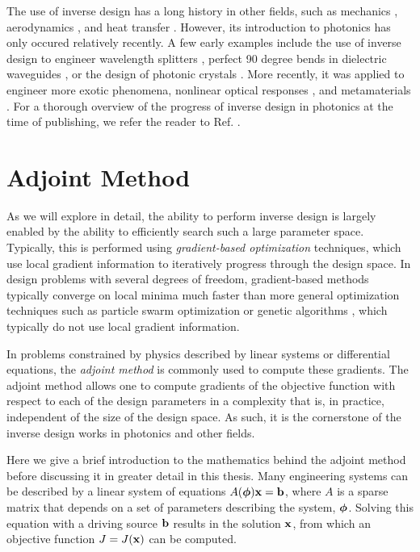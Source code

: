 The use of inverse design has a long history in other fields, such as mechanics \cite{tanaka_inverse_1998}, aerodynamics \cite{jameson_aerodynamic_nodate}, and heat transfer \cite{ozisik_inverse_2018}.
However, its introduction to photonics has only occured relatively recently.
A few early examples include the use of inverse design to engineer wavelength splitters \cite{piggott_inverse_2015}, perfect 90 degree bends in dielectric waveguides \cite{jensen_topology_2005}, or the design of photonic crystals \cite{borel_topology_2004}.
More recently, it was applied to engineer more exotic phenomena, nonlinear optical responses \cite{lin_cavity-enhanced_2016}, and metamaterials \cite{sigmund_systematic_2009}.
For a thorough overview of the progress of inverse design in photonics at the time of publishing, we refer the reader to Ref. .

\section{Adjoint Method}

As we will explore in detail, the ability to perform inverse design is largely enabled by the ability to efficiently search such a large parameter space.
Typically, this is performed using \textit{gradient-based optimization} techniques, which use local gradient information to iteratively progress through the design space.
In design problems with several degrees of freedom, gradient-based methods typically converge on local minima much faster than more general optimization techniques such as particle swarm optimization \cite{noauthor_particle_nodate} or genetic algorithms \cite{whitley_genetic_1994}, which typically do not use local gradient information.

In problems constrained by physics described by linear systems or differential equations, the \textit{adjoint method} is commonly used to compute these gradients.
The adjoint method allows one to compute gradients of the objective function with respect to each of the design parameters in a complexity that is, in practice, independent of the size of the design space.
As such, it is the cornerstone of the inverse design works in photonics and other fields.

Here we give a brief introduction to the mathematics behind the adjoint method before discussing it in greater detail in this thesis.
Many engineering systems can be described by a linear system of equations $A(\bm{\phi}) \mathbf{x} = \mathbf{b}$, where $A$ is a sparse matrix that depends on a set of parameters describing the system, $\bm{\phi}$.
Solving this equation with a driving source $\mathbf{b}$ results in the solution $\mathbf{x}$, from which an objective function $J=J(\mathbf{x})$ can be computed.


